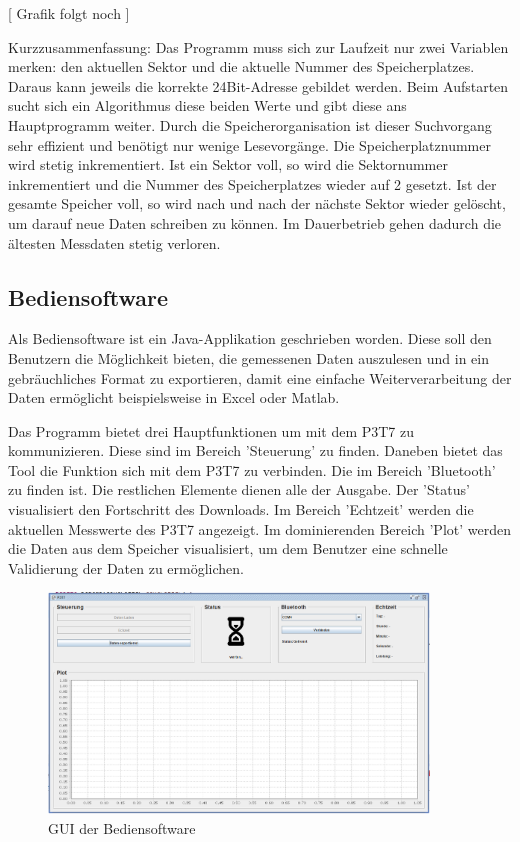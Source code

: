 [ Grafik folgt noch ] 

Kurzzusammenfassung:
Das Programm muss sich zur Laufzeit nur zwei Variablen merken: den aktuellen Sektor und die aktuelle Nummer des Speicherplatzes. Daraus kann jeweils die korrekte 24Bit-Adresse gebildet werden. Beim Aufstarten sucht sich ein Algorithmus diese beiden Werte und gibt diese ans Hauptprogramm weiter. Durch die Speicherorganisation ist dieser Suchvorgang sehr effizient und benötigt nur wenige Lesevorgänge. Die Speicherplatznummer wird stetig inkrementiert. Ist ein Sektor voll, so wird die Sektornummer inkrementiert und die Nummer des Speicherplatzes wieder auf 2 gesetzt. Ist der gesamte Speicher voll, so wird nach und nach der nächste Sektor wieder gelöscht, um darauf neue Daten schreiben zu können. Im Dauerbetrieb gehen dadurch die ältesten Messdaten stetig verloren. 



\pagebreak
\subsection{Bediensoftware}%
Als Bediensoftware ist ein Java-Applikation geschrieben worden. Diese soll den Benutzern die Möglichkeit bieten, die gemessenen Daten auszulesen und in ein gebräuchliches Format zu exportieren, damit eine einfache Weiterverarbeitung der Daten ermöglicht beispielsweise in Excel oder Matlab.

Das Programm bietet drei Hauptfunktionen um mit dem P3T7 zu kommunizieren. Diese sind im Bereich 'Steuerung' zu finden. Daneben bietet das Tool die Funktion sich mit dem P3T7 zu verbinden. Die im Bereich 'Bluetooth' zu finden ist. Die restlichen Elemente dienen alle der Ausgabe. Der 'Status' visualisiert den Fortschritt des Downloads. Im Bereich 'Echtzeit' werden die aktuellen Messwerte des P3T7 angezeigt. Im dominierenden Bereich 'Plot' werden die Daten aus dem Speicher visualisiert, um dem Benutzer eine schnelle Validierung der Daten zu ermöglichen.

\begin{figure}[H]
\begin{center}
\includegraphics[width=0.9\textwidth]{images/Software_GUI.png}
\caption{GUI der Bediensoftware}
\end{center}
\end{figure}

